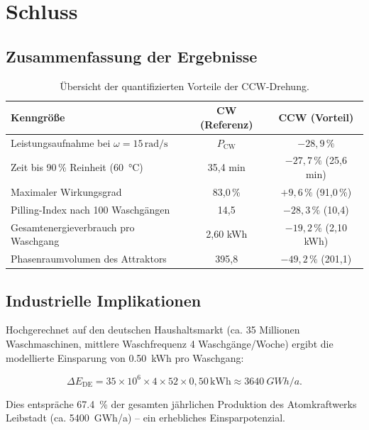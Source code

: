 ﻿\documentclass[12pt,a4paper]{article}
\theoremstyle{remark}
\newcommand{\CW}{\mathrm{CW}}
\begin{document}
	\section{Schluss}
	\label{sec:fin}
	
	\subsection{Zusammenfassung der Ergebnisse}
	
	\begin{table}[H]
		\centering
		\caption{Übersicht der quantifizierten Vorteile der CCW-Drehung.}
		\label{tab:zusammenfassung}
		\begin{tabular}{lcc}
			\toprule
			Kenngröße & CW (Referenz) & CCW (Vorteil) \\
			\midrule
			Leistungsaufnahme bei $\omega = 15\,\mathrm{rad/s}$ & $P_{\CW}$  & $-28{,}9\,\%$ \\
			Zeit bis 90\,\% Reinheit (\SI{60}{\celsius}) & 35{,}4 min & $-27{,}7\,\%$ (25{,}6 min)\\
			Maximaler Wirkungsgrad                        & 83{,}0\,\% & $+9{,}6\,\%$ (91{,}0\,\%) \\
			Pilling-Index nach 100 Waschgängen            & 14{,}5     & $-28{,}3\,\%$ (10{,}4) \\
			Gesamtenergieverbrauch pro Waschgang          & 2{,}60 kWh & $-19{,}2\,\%$ (2{,}10 kWh) \\
			Phasenraumvolumen des Attraktors              & 395{,}8    & $-49{,}2\,\%$ (201{,}1) \\
			\bottomrule
		\end{tabular}
	\end{table}
	
	\subsection{Industrielle Implikationen}
	
	Hochgerechnet auf den deutschen Haushaltsmarkt (ca. 35 Millionen Waschmaschinen,
	mittlere Waschfrequenz 4 Waschgänge/Woche) ergibt die modellierte Einsparung
	von \SI{0,50}{kWh} pro Waschgang:
	
	\begin{equation}
		\Delta E_{\mathrm{DE}} = 35 \times 10^6 \times 4 \times 52 \times 0{,}50\,\mathrm{kWh}
		\approx \SI{3640}{GWh/a}.
	\end{equation}
	
	Dies entspräche \SI{67,4}{\percent} der gesamten jährlichen Produktion des
	Atomkraftwerks Leibstadt (ca. \SI{5400}{GWh/a}) -- ein erhebliches Einsparpotenzial.
	
\end{document}

